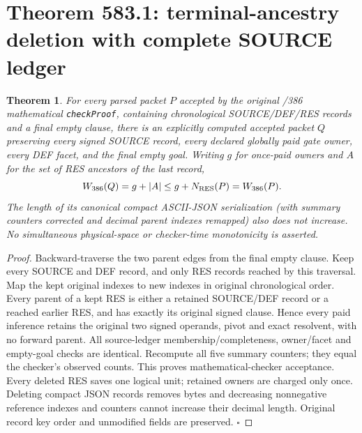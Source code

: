 \documentclass[11pt]{article}
\newtheorem{theorem}{Theorem}
\begin{document}
\section*{Theorem 583.1: terminal-ancestry deletion with complete SOURCE ledger}
\begin{theorem}
For every parsed packet $P$ accepted by the original /386 mathematical \texttt{checkProof}, containing chronological SOURCE/DEF/RES records and a final empty clause, there is an explicitly computed accepted packet $Q$ preserving every signed SOURCE record, every declared globally paid gate owner, every DEF facet, and the final empty goal. Writing $g$ for once-paid owners and $A$ for the set of RES ancestors of the last record,
\[
 W_{386}(Q)=g+|A|\leq g+N_{\rm RES}(P)=W_{386}(P).
\]
The length of its canonical compact ASCII-JSON serialization (with summary counters corrected and decimal parent indexes remapped) also does not increase. No simultaneous physical-space or checker-time monotonicity is asserted.
\end{theorem}
\begin{proof}
Backward-traverse the two parent edges from the final empty clause. Keep every SOURCE and DEF record, and only RES records reached by this traversal. Map the kept original indexes to new indexes in original chronological order. Every parent of a kept RES is either a retained SOURCE/DEF record or a reached earlier RES, and has exactly its original signed clause. Hence every paid inference retains the original two signed operands, pivot and exact resolvent, with no forward parent. All source-ledger membership/completeness, owner/facet and empty-goal checks are identical. Recompute all five summary counters; they equal the checker's observed counts. This proves mathematical-checker acceptance. Every deleted RES saves one logical unit; retained owners are charged only once. Deleting compact JSON records removes bytes and decreasing nonnegative reference indexes and counters cannot increase their decimal length. Original record key order and unmodified fields are preserved. \(\square\)
\end{proof}
\end{document}
